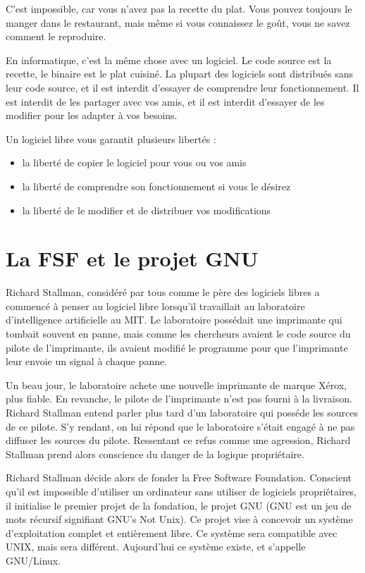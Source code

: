 \documentclass{article}
\begin{document}
C'est impossible, car vous n'avez pas la recette du plat. Vous pouvez toujours le manger dans le restaurant, mais même si vous connaissez le goût, vous ne savez comment le reproduire.

En informatique, c'est la même chose avec un logiciel. Le code source est la recette, le binaire est le plat cuisiné. La plupart des logiciels sont distribués sans leur code source, et il est interdit d'essayer de comprendre leur fonctionnement. Il est interdit de les partager avec vos amis, et il est interdit d'essayer de les modifier pour les adapter à vos besoins.

Un logiciel libre vous garantit plusieurs libertés :
\begin{itemize}
    \item la liberté de copier le logiciel pour vous ou vos amis
    \item la liberté de comprendre son fonctionnement si vous le désirez
    \item la liberté de le modifier et de distribuer vos modifications
\end{itemize}
\section{La FSF et le projet GNU}

Richard Stallman, considéré par tous comme le père des logiciels libres a commencé à penser au logiciel libre lorsqu'il travaillait au laboratoire d'intelligence artificielle au MIT. Le laboratoire possédait une imprimante qui tombait souvent en panne, mais comme les chercheurs avaient le code source du pilote de l'imprimante, ils avaient modifié le programme pour que l'imprimante leur envoie un signal à chaque panne.

Un beau jour, le laboratoire achete une nouvelle imprimante de marque Xérox, plus fiable. En revanche, le pilote de l'imprimante n'est pas fourni à la livraison. Richard Stallman entend parler plus tard d'un laboratoire qui posséde les sources de ce pilote. S'y rendant, on lui répond que le laboratoire s'était engagé à ne pas diffuser les sources du pilote. Ressentant ce refus comme une agression, Richard Stallman prend alors conscience du danger de la logique propriétaire.

Richard Stallman décide alors de fonder la Free Software Foundation. Conscient qu'il est impossible d'utiliser un ordinateur sans utiliser de logiciels propriétaires, il initialise le premier projet de la fondation, le projet GNU (GNU est un jeu de mots récursif signifiant GNU's Not Unix). Ce projet vise à concevoir un système d'exploitation complet et entièrement libre. Ce système sera compatible avec UNIX, mais sera différent. Aujourd'hui ce système existe, et s'appelle GNU/Linux.
\end{document}
